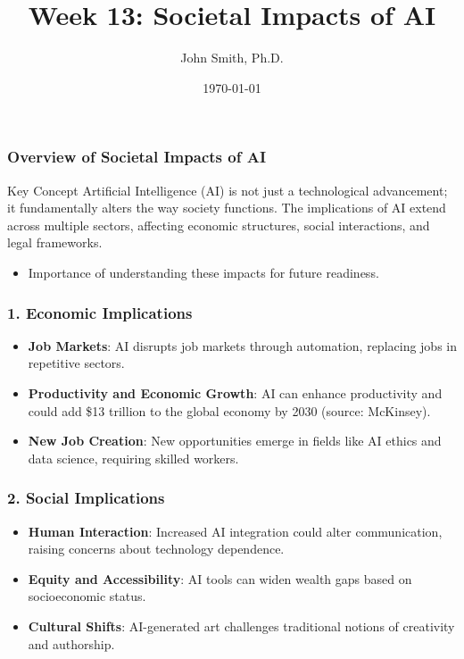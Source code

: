 \documentclass[aspectratio=169]{beamer}
\title[Societal Impacts of AI]{Week 13: Societal Impacts of AI}
\author[J. Smith]{John Smith, Ph.D.}
\institute[University Name]{
  Department of Computer Science\\
  University Name\\
  \vspace{0.3cm}
  Email: email@university.edu\\
  Website: www.university.edu
}
\date{\today}
\begin{document}
\frame{\titlepage}

\begin{frame}[fragile]
    \titlepage
\end{frame}

\begin{frame}[fragile]
    \frametitle{Overview of Societal Impacts of AI}
    \begin{block}{Key Concept}
        Artificial Intelligence (AI) is not just a technological advancement; it fundamentally alters the way society functions. The implications of AI extend across multiple sectors, affecting economic structures, social interactions, and legal frameworks.
    \end{block}
    \begin{itemize}
        \item Importance of understanding these impacts for future readiness.
    \end{itemize}
\end{frame}

\begin{frame}[fragile]
    \frametitle{1. Economic Implications}
    \begin{itemize}
        \item \textbf{Job Markets}: AI disrupts job markets through automation, replacing jobs in repetitive sectors.
        \item \textbf{Productivity and Economic Growth}: AI can enhance productivity and could add \$13 trillion to the global economy by 2030 (source: McKinsey).
        \item \textbf{New Job Creation}: New opportunities emerge in fields like AI ethics and data science, requiring skilled workers.
    \end{itemize}
\end{frame}

\begin{frame}[fragile]
    \frametitle{2. Social Implications}
    \begin{itemize}
        \item \textbf{Human Interaction}: Increased AI integration could alter communication, raising concerns about technology dependence.
        \item \textbf{Equity and Accessibility}: AI tools can widen wealth gaps based on socioeconomic status.
        \item \textbf{Cultural Shifts}: AI-generated art challenges traditional notions of creativity and authorship.
    \end{itemize}
\end{frame}
\end{document}
